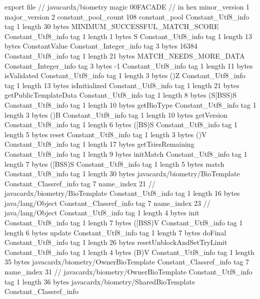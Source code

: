 export file {		// javacardx/biometry
	magic	00FACADE		 // in hex
	minor_version	1
	major_version	2
	constant_pool_count	108
	constant_pool {
		Constant_Utf8_info {
			tag	1
			length	30
			bytes	MINIMUM_SUCCESSFUL_MATCH_SCORE
		}
		Constant_Utf8_info {
			tag	1
			length	1
			bytes	S
		}
		Constant_Utf8_info {
			tag	1
			length	13
			bytes	ConstantValue
		}
		Constant_Integer_info {
			tag	3
			bytes	16384
		}
		Constant_Utf8_info {
			tag	1
			length	21
			bytes	MATCH_NEEDS_MORE_DATA
		}
		Constant_Integer_info {
			tag	3
			bytes	-1
		}
		Constant_Utf8_info {
			tag	1
			length	11
			bytes	isValidated
		}
		Constant_Utf8_info {
			tag	1
			length	3
			bytes	()Z
		}
		Constant_Utf8_info {
			tag	1
			length	13
			bytes	isInitialized
		}
		Constant_Utf8_info {
			tag	1
			length	21
			bytes	getPublicTemplateData
		}
		Constant_Utf8_info {
			tag	1
			length	8
			bytes	(S[BSS)S
		}
		Constant_Utf8_info {
			tag	1
			length	10
			bytes	getBioType
		}
		Constant_Utf8_info {
			tag	1
			length	3
			bytes	()B
		}
		Constant_Utf8_info {
			tag	1
			length	10
			bytes	getVersion
		}
		Constant_Utf8_info {
			tag	1
			length	6
			bytes	([BS)S
		}
		Constant_Utf8_info {
			tag	1
			length	5
			bytes	reset
		}
		Constant_Utf8_info {
			tag	1
			length	3
			bytes	()V
		}
		Constant_Utf8_info {
			tag	1
			length	17
			bytes	getTriesRemaining
		}
		Constant_Utf8_info {
			tag	1
			length	9
			bytes	initMatch
		}
		Constant_Utf8_info {
			tag	1
			length	7
			bytes	([BSS)S
		}
		Constant_Utf8_info {
			tag	1
			length	5
			bytes	match
		}
		Constant_Utf8_info {
			tag	1
			length	30
			bytes	javacardx/biometry/BioTemplate
		}
		Constant_Classref_info {
			tag	7
			name_index	21		// javacardx/biometry/BioTemplate
		}
		Constant_Utf8_info {
			tag	1
			length	16
			bytes	java/lang/Object
		}
		Constant_Classref_info {
			tag	7
			name_index	23		// java/lang/Object
		}
		Constant_Utf8_info {
			tag	1
			length	4
			bytes	init
		}
		Constant_Utf8_info {
			tag	1
			length	7
			bytes	([BSS)V
		}
		Constant_Utf8_info {
			tag	1
			length	6
			bytes	update
		}
		Constant_Utf8_info {
			tag	1
			length	7
			bytes	doFinal
		}
		Constant_Utf8_info {
			tag	1
			length	26
			bytes	resetUnblockAndSetTryLimit
		}
		Constant_Utf8_info {
			tag	1
			length	4
			bytes	(B)V
		}
		Constant_Utf8_info {
			tag	1
			length	35
			bytes	javacardx/biometry/OwnerBioTemplate
		}
		Constant_Classref_info {
			tag	7
			name_index	31		// javacardx/biometry/OwnerBioTemplate
		}
		Constant_Utf8_info {
			tag	1
			length	36
			bytes	javacardx/biometry/SharedBioTemplate
		}
		Constant_Classref_info {
}}}
